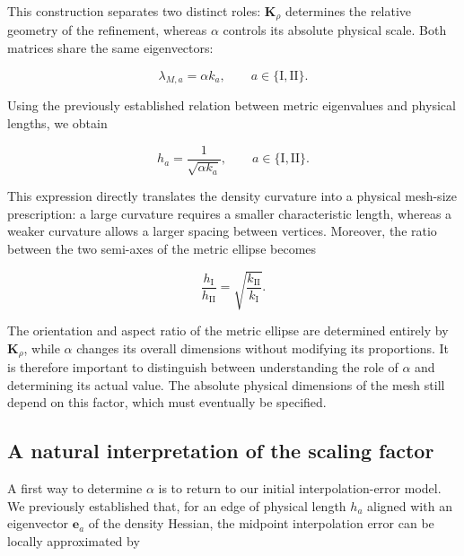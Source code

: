 \documentclass[11pt,a4paper]{article}
\begin{document}
\noindent
This construction separates two distinct roles:
$\mathbf{K}_\rho$ determines the relative geometry
of the refinement, whereas $\alpha$ controls its
absolute physical scale.
Both matrices share the same
eigenvectors: 

\begin{equation}
    \boxed{
        \lambda_{M,a}=\alpha k_a,
        \qquad a\in\{\mathrm{I},\mathrm{II}\}.
    }
\end{equation}

\noindent
Using the previously established relation between
metric eigenvalues and physical lengths, we obtain

\begin{equation}
    \boxed{
        h_a=\frac{1}{\sqrt{\alpha k_a}},
        \qquad a\in\{\mathrm{I},\mathrm{II}\}.
    }
\end{equation}

\noindent
This expression directly translates the density
curvature into a physical mesh-size prescription:
a large curvature requires a smaller characteristic
length, whereas a weaker curvature allows a larger
spacing between vertices. Moreover, the ratio between the two semi-axes of
the metric ellipse becomes

\begin{equation}
    \boxed{
        \frac{h_{\mathrm{I}}}{h_{\mathrm{II}}}
        =
        \sqrt{
            \frac{k_{\mathrm{II}}}{k_{\mathrm{I}}}
        }.
    }
\end{equation}

\noindent
The orientation and aspect
ratio of the metric ellipse are determined entirely
by $\mathbf{K}_\rho$, while $\alpha$ changes its
overall dimensions without modifying its proportions.
It is therefore important to distinguish between
understanding the role of $\alpha$ and determining
its actual value. The absolute physical dimensions
of the mesh still depend on this factor, which must
eventually be specified.



\subsection{A natural interpretation of the scaling factor}

\noindent
A first way to determine $\alpha$ is to return to
our initial interpolation-error model. We previously established that, for an edge of physical length $h_a$ aligned with an eigenvector $\mathbf{e}_a$
of the density Hessian, the midpoint interpolation
error can be locally approximated by
\end{document}
